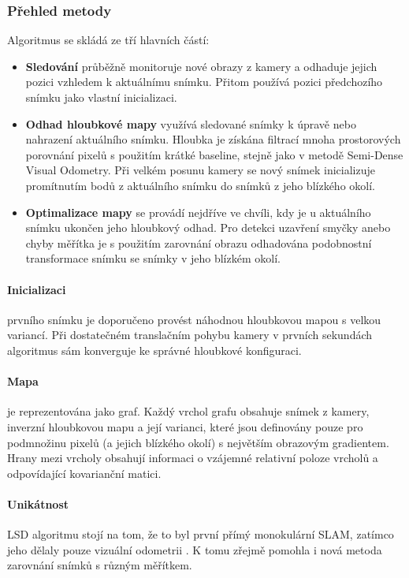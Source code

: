 \documentclass[12pt,a4paper]{article}
\begin{document}
\subsubsection{Přehled metody}
Algoritmus se skládá ze tří hlavních částí:
\begin{itemize}
	\item \textbf{Sledování} průběžně monitoruje nové obrazy z kamery a odhaduje jejich pozici vzhledem k aktuálnímu snímku. Přitom používá pozici předchozího snímku jako vlastní inicializaci. 
	\item \textbf{Odhad hloubkové mapy} využívá sledované snímky k úpravě nebo nahrazení aktuálního snímku. Hloubka je získána filtrací mnoha prostorových porovnání pixelů s použitím krátké baseline, stejně jako v metodě Semi-Dense Visual Odometry. Při velkém posunu kamery se nový snímek inicializuje promítnutím bodů z aktuálního snímku do snímků z jeho blízkého okolí. 
	\item \textbf{Optimalizace mapy} se provádí nejdříve ve chvíli, kdy je u aktuálního snímku ukončen jeho hloubkový odhad. Pro detekci uzavření smyčky anebo chyby měřítka je s použitím zarovnání obrazu odhadována podobnostní transformace snímku se snímky v jeho blízkém okolí.
\end{itemize}

\paragraph{Inicializaci} prvního snímku je doporučeno provést náhodnou hloubkovou mapou s velkou variancí. Při dostatečném translačním pohybu kamery v prvních sekundách algoritmus sám konverguje ke správné hloubkové konfiguraci.

\paragraph{Mapa} je reprezentována jako graf. Každý vrchol grafu obsahuje snímek z kamery, inverzní hloubkovou mapu a její varianci, které jsou definovány pouze pro podmnožinu pixelů (a jejich blízkého okolí) s největším obrazovým gradientem. Hrany mezi vrcholy obsahují informaci o vzájemné relativní poloze vrcholů a odpovídající kovarianční matici.

\paragraph{Unikátnost} LSD algoritmu stojí na tom, že to byl první přímý monokulární SLAM, zatímco jeho  dělaly pouze vizuální odometrii \cite{Engel14_LSD}. K tomu zřejmě pomohla i nová metoda zarovnání snímků s různým měřítkem. 
\end{document}
